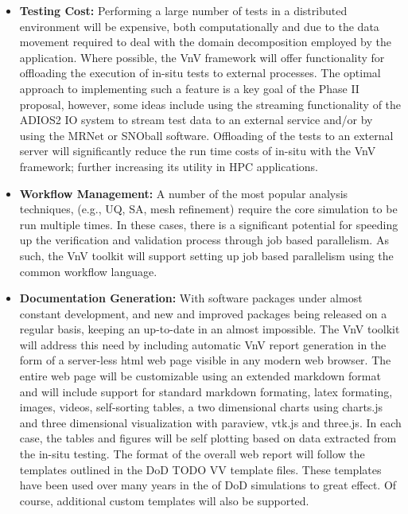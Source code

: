 \begin{itemize}
 \item{\bf \VV Testing Cost:}  Performing a large number of \VV tests in a distributed environment will be expensive, both computationally and due to the data movement required to deal with the domain decomposition employed by the application. Where possible, the VnV framework will offer functionality for offloading the execution of in-situ tests to external processes. The optimal approach to implementing such a feature is a key goal of the Phase II proposal, however, some ideas include using the streaming functionality of the ADIOS2 IO system to stream test data to an external \VV service and/or by using the MRNet or SNOball software. Offloading of the tests to an external server will significantly reduce the run time costs of in-situ \VV with the VnV framework; further increasing its utility in HPC applications.  
 \item{\bf Workflow Management:} A number of the most popular \VV analysis techniques, (e.g., UQ, SA, mesh refinement) require the core simulation to be run multiple times. In these cases, there is a significant potential for speeding up the verification and validation process through job based parallelism. As such, the VnV toolkit will support setting up job based parallelism using the common workflow language. 
 \item{\bf Documentation Generation:} With software packages under almost constant development, and new and improved packages being released on a regular basis, keeping an up-to-date \VV in an almost impossible. The VnV toolkit 
 will address this need by including automatic VnV report generation in the form of a server-less html web page visible in any modern web browser. The entire web page will be customizable using an extended markdown format and will include support for standard markdown formating, latex formating, images, videos, self-sorting tables, a two dimensional charts using charts.js  and three dimensional visualization with paraview, vtk.js and three.js. In each case, the tables and figures will be self plotting based on data extracted from the in-situ \VV testing. The format of the overall web report will follow the templates outlined in the DoD TODO VV template files. These templates have been used over many years in the \VVA of DoD simulations to great effect. Of course, additional custom templates will also be supported. 
 \end{itemize}

